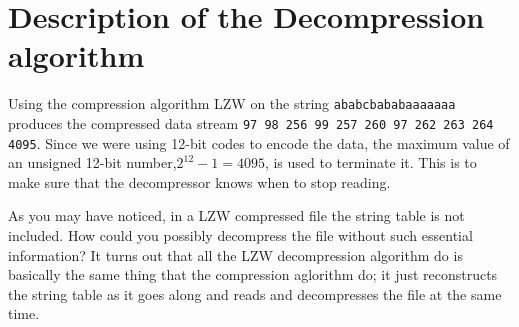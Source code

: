 \begin{refsection}
\begin{algorithm}[H]
\begin{algorithmic}[1]




        \Else {}



        \EndIf
      \EndWhile
    \EndFunction
  \end{algorithmic}
\end{algorithm}

\section{Description of the Decompression algorithm}

Using the compression algorithm LZW on the string
\texttt{ababcbababaaaaaaa} produces the compressed data stream
\texttt{97 98 256 99 257 260 97 262 263 264 4095}. Since we were using
12-bit codes to encode the data, the maximum value of an unsigned
12-bit number,$2^{12} - 1 = 4095$, is used to terminate it. This is to
make sure that the decompressor knows when to stop reading.

As you may have noticed, in a LZW compressed file the string table is
not included. How could you possibly decompress the file without such
essential information? It turns out that all the LZW decompression
algorithm do is basically the same thing that the compression aglorithm do; it
just reconstructs the string table as it goes along and  reads and decompresses the
file at the same time.


\end{refsection}
